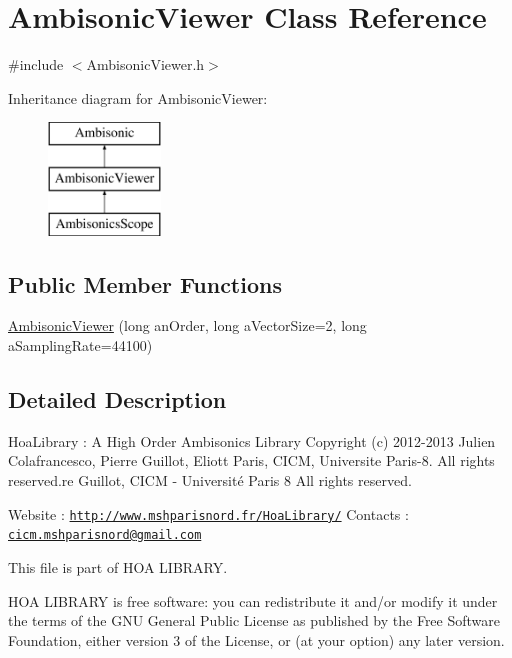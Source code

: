 \hypertarget{class_ambisonic_viewer}{\section{Ambisonic\-Viewer Class Reference}
\label{class_ambisonic_viewer}
}


{\ttfamily \#include $<$Ambisonic\-Viewer.\-h$>$}

Inheritance diagram for Ambisonic\-Viewer\-:\begin{figure}[H]
\begin{center}
\leavevmode
\includegraphics[height=3.000000cm]{class_ambisonic_viewer}
\end{center}
\end{figure}
\subsection*{Public Member Functions}
\begin{DoxyCompactItemize}
\item 
\hyperlink{class_ambisonic_viewer_aed38fd89c057c2b707a2bc5e91b17861}{Ambisonic\-Viewer} (long an\-Order, long a\-Vector\-Size=2, long a\-Sampling\-Rate=44100)
\end{DoxyCompactItemize}


\subsection{Detailed Description}
Hoa\-Library \-: A High Order Ambisonics Library Copyright (c) 2012-\/2013 Julien Colafrancesco, Pierre Guillot, Eliott Paris, C\-I\-C\-M, Universite Paris-\/8. All rights reserved.\-re Guillot, C\-I\-C\-M -\/ Université Paris 8 All rights reserved.

Website \-: \href{http://www.mshparisnord.fr/HoaLibrary/}{\tt http\-://www.\-mshparisnord.\-fr/\-Hoa\-Library/} Contacts \-: \href{mailto:cicm.mshparisnord@gmail.com}{\tt cicm.\-mshparisnord@gmail.\-com}

This file is part of H\-O\-A L\-I\-B\-R\-A\-R\-Y.

H\-O\-A L\-I\-B\-R\-A\-R\-Y is free software\-: you can redistribute it and/or modify it under the terms of the G\-N\-U General Public License as published by the Free Software Foundation, either version 3 of the License, or (at your option) any later version.

